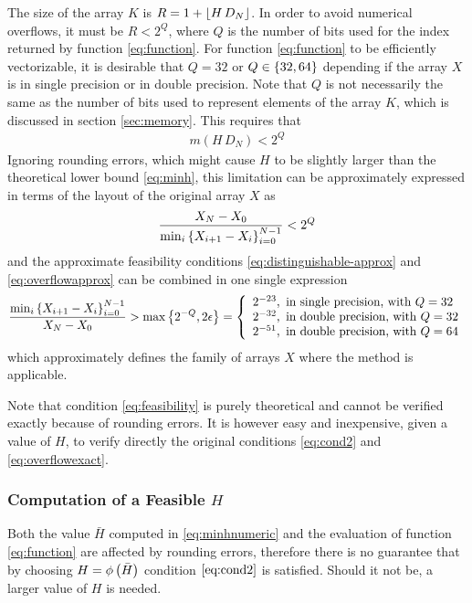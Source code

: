 \documentclass[preprint,1p,times]{elsarticle}
\begin{document}
The size of the array $K$ is $R=1+\left \lfloor H\, D_N \right \rfloor$. In order to avoid numerical overflows, it must be $R < 2^{Q}$, where $Q$ is the number of bits used for the index returned by function \eqref{eq:function}. For function \eqref{eq:function} to be efficiently vectorizable, it is desirable that $Q=32$ or $Q\in\left \{ 32,64 \right \}$ depending if the array $X$ is in single precision or in double precision. Note that $Q$ is not necessarily the same as the number of bits used to represent elements of the array $K$, which is discussed in section \ref{sec:memory}. This requires that
\begin{align}
\label{eq:overflowexact}
m(H\, D_N) < 2^Q
\end{align}
Ignoring rounding errors, which might cause $H$ to be slightly larger than the theoretical lower bound \eqref{eq:minh}, this limitation can be approximately expressed in terms of the layout of the original array $X$ as
\begin{align}
\label{eq:overflowapprox}
\frac{X_N-X_0}{\min_i\left \{ X_{i+1}-X_i \right \}_{i=0}^{N-1}}< 2^Q
\end{align}
and the approximate feasibility conditions \eqref{eq:distinguishable-approx} and \eqref{eq:overflowapprox} can be combined in one single expression
\begin{equation}
\label{eq:feasibility}
\frac{\min_i\left \{ X_{i+1}-X_i \right \}_{i=0}^{N-1}}{X_N-X_0} 
    > \max \left \{ 2^{-Q}, 2\epsilon \right \} 
    = \left\{ \begin{array}{l}
 	   2^{-23},\text{   in single precision, with }Q=32 \\
   	   2^{-32},\text{   in double precision, with }Q=32 \\
   	   2^{-51},\text{   in double precision, with }Q=64
    \end{array}\right.
\end{equation}
which approximately defines the family of arrays $X$ where the method is applicable.

Note that condition \eqref{eq:feasibility} is purely theoretical and cannot be verified exactly because of rounding errors.
It is however easy and inexpensive, given a value of $H$, to verify directly the original conditions \eqref{eq:cond2} and \eqref{eq:overflowexact}.

\subsubsection{Computation of a Feasible $H$}
\label{sec:feasibleh}
Both the value $\bar{H}$ computed in \eqref{eq:minhnumeric} and the evaluation of function \eqref{eq:function} are affected by rounding errors, therefore there is no guarantee that by choosing $H=\phi\left(\bar{H}\right)$ condition $\eqref{eq:cond2}$ is satisfied. Should it not be, a larger value of $H$ is needed.
\end{document}
